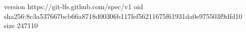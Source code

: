 version https://git-lfs.github.com/spec/v1
oid sha256:8c3a537667bcb66a8718d00306b117fef56211675f61931da0e975503f9dfd10
size 247110
